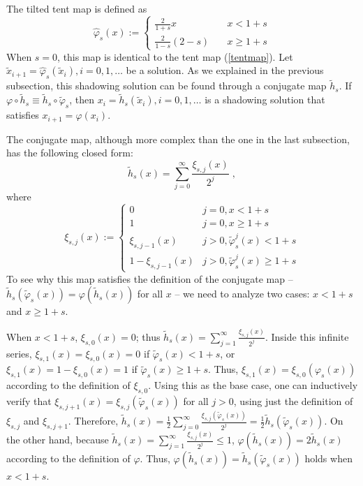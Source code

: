 The tilted tent map is defined as
\begin{equation} \label{tent_tilted}
    \hat\varphi_s(x) := \begin{cases}
    \frac2{1+s} x \quad & x < 1+s \\
    \frac2{1-s}(2-s) \quad & x \ge 1+s
    \end{cases}
\end{equation}
When $s=0$, this map is identical to the tent map (\ref{tentmap}).
Let $\tilde{x}_{i+1}=\hat\varphi_s(\tilde{x}_i), i=0,1,\ldots$ be a solution.
As we explained in the previous subsection,
this shadowing solution can be found through a conjugate map $\tilde{h}_s$.
If $\varphi\circ \tilde{h}_s \equiv \tilde{h}_s\circ\tilde\varphi_s$,
then $x_i=\tilde{h}_s(\tilde{x}_i), i=0,1,\ldots$ is a shadowing solution
that satisfies $x_{i+1} = \varphi(x_i)$.

The conjugate map, although more complex than the one
in the last subsection, has the following closed form:
\begin{equation} \label{conjugate_tilted}
    \tilde{h}_s(x) = \sum_{j=0}^{\infty} \frac{\xi_{s,j}(x)}{2^j}\;,
\end{equation}
where
\begin{equation} \label{conjugate_tilted_helper}
    \xi_{s,j}(x) := \begin{cases}
    0 & j=0, x<1+s \\
    1 & j=0, x\ge 1+s \\
    \xi_{s,j-1}(x) & j>0, \tilde\varphi_s^j(x) < 1+s \\
    1 - \xi_{s,j-1}(x) & j>0, \tilde\varphi_s^j(x) \ge 1+s
    \end{cases}
\end{equation}
To see why this map satisfies the definition of the conjugate map --
$\tilde{h}_s(\tilde\varphi_s(x)) = \varphi(\tilde{h}_s(x))$ for all $x$ --
we need to analyze two cases: $x<1+s$ and $x\ge 1+s$.

When $x<1+s$, $\xi_{s,0}(x)=0$; thus
$\tilde{h}_s(x) = \sum_{j=1}^{\infty} \frac{\xi_{s,j}(x)}{2^j}$.
Inside this infinite series, $\xi_{s,1}(x)=\xi_{s,0}(x)=0$ if $\tilde\varphi_s(x)<1+s$,
or $\xi_{s,1}(x)=1-\xi_{s,0}(x)=1$ if $\tilde\varphi_s(x)\ge 1+s$.
Thus, $\xi_{s,1}(x) = \xi_{s,0}(\varphi_s(x))$ according to the definition of $\xi_{s,0}$.
Using this as the base case, one can inductively verify that
$\xi_{s,j+1}(x) = \xi_{s,j}(\tilde\varphi_s(x))$
for all $j>0$, using just the definition of $\xi_{s,j}$ and $\xi_{s,j+1}$.
Therefore,
$\tilde{h}_s(x) = \frac12 \sum_{j=0}^{\infty} \frac{\xi_{s,j}(\tilde\varphi_s(x))}{2^j}
=\frac12 \tilde{h}_s(\tilde\varphi_s(x))$.
On the other hand, because
$\tilde{h}_s(x) = \sum_{j=1}^{\infty} \frac{\xi_{s,j}(x)}{2^j}\le1$,
$\varphi(\tilde{h}_s(x)) = 2\tilde{h}_s(x)$ according
to the definition of $\varphi$.  Thus,
$\varphi(\tilde{h}_s(x)) = \tilde{h}_s(\tilde\varphi_s(x))$ holds when $x<1+s$.

